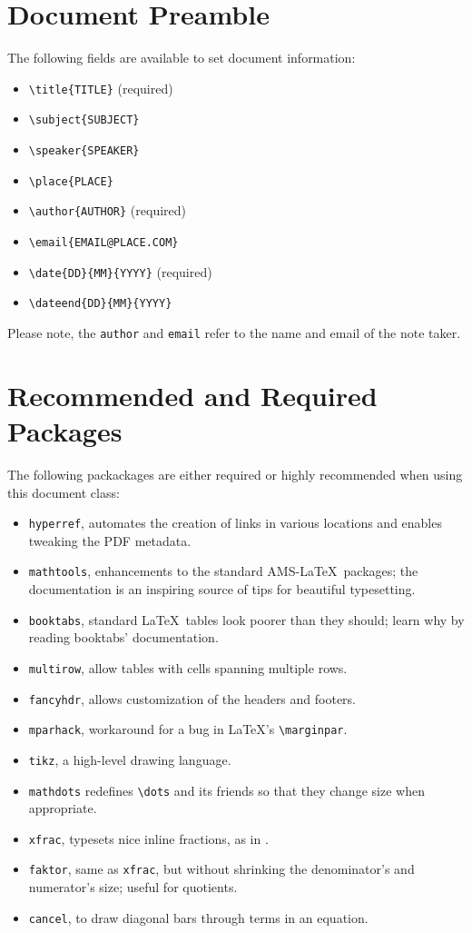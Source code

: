 \documentclass[english,course,twocolumn]{notes}
\begin{document}
\section{Document Preamble}

The following fields are available to set document information:
\begin{itemize}
\item \verb|\title{TITLE}| (required)
\item \verb|\subject{SUBJECT}|
\item \verb|\speaker{SPEAKER}|
\item \verb|\place{PLACE}|
\item \verb|\author{AUTHOR}| (required)
\item \verb|\email{EMAIL@PLACE.COM}|
\item \verb|\date{DD}{MM}{YYYY}| (required)
\item \verb|\dateend{DD}{MM}{YYYY}|
\end{itemize}
Please note, the \verb|author| and \verb|email| refer to the name and email of the note taker.

\section{Recommended and Required Packages}

The following packackages are either required or highly recommended when using this document class:
\begin{itemize}
\item \verb|hyperref|, automates the creation of links in various locations and enables tweaking the PDF metadata.
\item \verb|mathtools|, enhancements to the standard AMS-\LaTeX\ packages; the documentation is an inspiring source of tips for beautiful typesetting.
\item \verb|booktabs|, standard \LaTeX\ tables look poorer than they should; learn why by reading booktabs' documentation.
\item \verb|multirow|, allow tables with cells spanning multiple rows.
\item \verb|fancyhdr|, allows customization of the headers and footers.
\item \verb|mparhack|, workaround for a bug in \LaTeX's \verb|\marginpar|.
\item \verb|tikz|, a high-level drawing language.
\item \verb|mathdots| redefines \verb|\dots| and its friends so that they change size when appropriate.
\item \verb|xfrac|, typesets nice inline fractions, as in .
\item \verb|faktor|, same as \verb|xfrac|, but without shrinking the denominator's and numerator's size; useful for quotients.
\item \verb|cancel|, to draw diagonal bars through terms in an equation.
\end{itemize}
\end{document}
